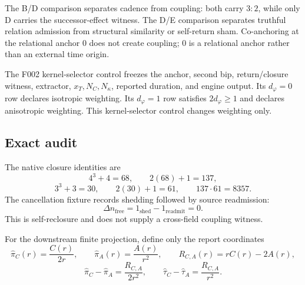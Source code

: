 The B/D comparison separates cadence from coupling: both carry \(3{:}2\), while only D carries the successor-effect witness. The D/E comparison separates truthful relation admission from structural similarity or self-return sham. Co-anchoring at the relational anchor 0 does not create coupling; 0 is a relational anchor rather than an external time origin.

The F002 kernel-selector control freezes the anchor, second bip,
return/closure witness, extractor, \(x_T,N_C,N_\kappa\), reported
duration, and engine output. Its \(d_\varphi=0\) row declares isotropic
weighting. Its \(d_\varphi=1\) row satisfies \(2d_\varphi\ge1\) and
declares anisotropic weighting. This kernel-selector control changes
weighting only.

\subsection{Exact audit}\label{manual:phase-temporal:exact-audit}
The native closure identities are
\[
4^3+4=68,
\qquad
2(68)+1=137,
\]
\[
3^3+3=30,
\qquad
2(30)+1=61,
\qquad
137\cdot61=8357.
\]
The cancellation fixture records shedding followed by source readmission:
\[
\Delta n_{\mathrm{free}}
=1_{\mathrm{shed}}-1_{\mathrm{readmit}}=0.
\]
This is self-reclosure and does not supply a cross-field coupling witness.

For the downstream finite projection, define only the report coordinates
\[
\widehat\pi_C(r)=\frac{C(r)}{2r},
\qquad
\widehat\pi_A(r)=\frac{A(r)}{r^2},
\qquad
R_{C,A}(r)=rC(r)-2A(r),
\]
\[
\widehat\pi_C-\widehat\pi_A
=\frac{R_{C,A}}{2r^2},
\qquad
\widehat\tau_C-\widehat\tau_A
=\frac{R_{C,A}}{r^2}.
\]

\begin{table}[H]
\centering
\scriptsize
\caption{All nine retained exact rows of the downstream finite \(\pi\)-projection audit.}
\label{tab:manual-finite-pi-projection}
\end{table}

